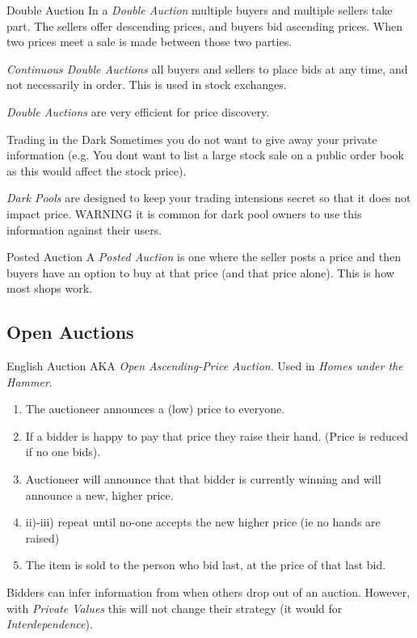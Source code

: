 \documentclass[11pt,a4paper]{article}
\begin{document}
\begin{definition}{Double Auction}
  In a \textit{Double Auction} multiple buyers and multiple sellers take part. The sellers offer descending prices, and buyers bid ascending prices. When two prices meet a sale is made between those two parties.
  \par \textit{Continuous Double Auctions} all buyers and sellers to place bids at any time, and not necessarily in order. This is used in stock exchanges.
  \par \textit{Double Auctions} are very efficient for price discovery.
\end{definition}

\begin{proposition}{Trading in the Dark}
  Sometimes you do not want to give away your private information (e.g. You dont want to list a large stock sale on a public order book as this would affect the stock price).
  \par \textit{Dark Pools} are designed to keep your trading intensions secret so that it does not impact price. WARNING it is common for dark pool owners to use this information against their users.
\end{proposition}

\begin{definition}{Posted Auction}
  A \textit{Posted Auction} is one where the seller posts a price and then buyers have an option to buy at that price (and that price alone). This is how most shops work.
\end{definition}

\subsection{Open Auctions}

\begin{definition}{English Auction}
  AKA \textit{Open Ascending-Price Auction}. Used in \textit{Homes under the Hammer}.
  \begin{enumerate}
    \item The auctioneer announces a (low) price to everyone.
    \item If a bidder is happy to pay that price they raise their hand. (Price is reduced if no one bids).
    \item Auctioneer will announce that that bidder is currently winning and will announce a new, higher price.
    \item ii)-iii) repeat until no-one accepts the new higher price (ie no hands are raised)
    \item The item is sold to the person who bid last, at the price of that last bid.
  \end{enumerate}
  Bidders can infer information from when others drop out of an auction. However, with \textit{Private Values} this will not change their strategy (it would for \textit{Interdependence}).
\end{definition}
\end{document}
